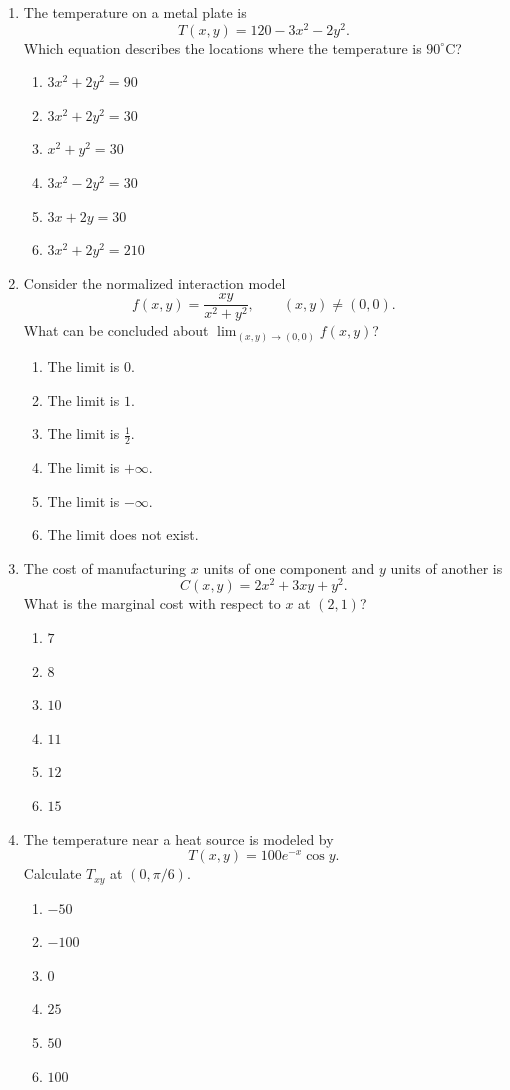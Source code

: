 \documentclass[a4paper,12pt]{article}
\theoremstyle{mystyle}
\numberwithin{equation}{section}
\numberwithin{theorem}{section}
\numberwithin{proposition}{section}
\numberwithin{example}{section}
\numberwithin{remark}{section}
\numberwithin{lemma}{section}
\numberwithin{corollary}{section}
\numberwithin{definition}{section}
\begin{document}
\begin{enumerate}[label=\textbf{Question \arabic*.},leftmargin=*]

\item The temperature on a metal plate is
\[
T(x,y)=120-3x^2-2y^2.
\]
Which equation describes the locations where the temperature is
\(90^\circ\mathrm{C}\)?
\begin{enumerate}[label=(\Alph*)]
\item \(3x^2+2y^2=90\)
\item \(3x^2+2y^2=30\)
\item \(x^2+y^2=30\)
\item \(3x^2-2y^2=30\)
\item \(3x+2y=30\)
\item \(3x^2+2y^2=210\)
\end{enumerate}

\item Consider the normalized interaction model
\[
f(x,y)=\frac{xy}{x^2+y^2},\qquad (x,y)\ne(0,0).
\]
What can be concluded about \(\lim_{(x,y)\to(0,0)}f(x,y)\)?
\begin{enumerate}[label=(\Alph*)]
\item The limit is \(0\).
\item The limit is \(1\).
\item The limit is \(\frac12\).
\item The limit is \(+\infty\).
\item The limit is \(-\infty\).
\item The limit does not exist.
\end{enumerate}

\item The cost of manufacturing \(x\) units of one component and
\(y\) units of another is
\[
C(x,y)=2x^2+3xy+y^2.
\]
What is the marginal cost with respect to \(x\) at \((2,1)\)?
\begin{enumerate}[label=(\Alph*)]
\item \(7\)
\item \(8\)
\item \(10\)
\item \(11\)
\item \(12\)
\item \(15\)
\end{enumerate}

\item The temperature near a heat source is modeled by
\[
T(x,y)=100e^{-x}\cos y.
\]
Calculate \(T_{xy}\) at \((0,\pi/6)\).
\begin{enumerate}[label=(\Alph*)]
\item \(-50\)
\item \(-100\)
\item \(0\)
\item \(25\)
\item \(50\)
\item \(100\)
\end{enumerate}


\end{enumerate}
\end{document}
